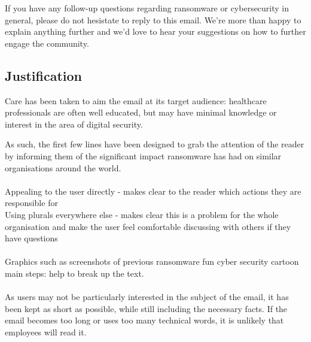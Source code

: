 \documentclass{article}
\begin{document}
If you have any follow-up questions regarding ransomware or cybersecurity in general, please do not hesistate to reply to this email. We're more than happy to explain anything further and we'd love to hear your suggestions on how to further engage the community.

\newpage
\subsection{Justification}%
Care has been taken to aim the email at its target audience: healthcare professionals are often well educated, but may have minimal knowledge or interest in the area of digital security.

As such, the first few lines have been designed to grab the attention of the reader by informing them of the significant impact ransomware has had on similar organisations around the world.
\\\\
Appealing to the user directly - makes clear to the reader which actions they are responsible for\\
Using plurals everywhere else - makes clear this is a problem for the whole organisation and make the user feel comfortable discussing with others if they have questions
\\\\
Graphics such as 
	screenshots of previous ransomware
	fun cyber security cartoon
	main steps:
help to break up the text.
\\\\


As users may not be particularly interested in the subject of the email, it has been kept as short as possible, while still including the necessary facts.
If the email becomes too long or uses too many technical words, it is unlikely that employees will read it.
\end{document}
